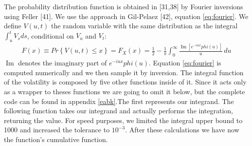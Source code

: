 \documentclass[12pt,twoside]{reedthesis}
\theoremstyle{definition}
\theoremstyle{definition}
\theoremstyle{remark}
\begin{document}
  The probability distribution function is obtained in {[}31,38{]} by
  Fourier inversions using Feller {[}41{]}. We use the approach in
  Gil-Pelaez {[}42{]}, equation \eqref{eq:fourier}. We define \(V(u,t)\) the
  random variable with the same distribution as the integral
  \(\int_{u}^{t}{V_s ds}\), conditional on \(V_u\) and \(V_t\):
  \begin{align} \label{eq:fourier}
  F(x) \equiv Pr \left\{ V(u,t) \leq x \right\} = F_{X}(x)={\frac {1}{2}}-{\frac {1}{\pi }}\int _{0}^{\infty }{\frac {\operatorname {Im} [e^{-iux} phi (u)]}{u}}\,du
  \end{align}
  \(\operatorname {Im}\) denotes the imaginary part of
  \(e^{-iux} phi (u)\). Equation \eqref{eq:fourier} is computed numerically
  and we then sample it by inversion. The integral function of the
  volatility is composed by five other functions inside of it. Since it
  acts only as a wrapper to theses functions we are going to omit it
  below, but the complete code can be found in appendix \ref{eabk}.The
  first represents our integrand. The following function takes our
  integrand and actually performs the integration, returning the value.
  For speed purposes, we limited the integral upper bound to 1000 and
  increased the tolerance to \(10^{-3}\). After these calculations we have
  now the function's cumulative function.
  
\end{document}
